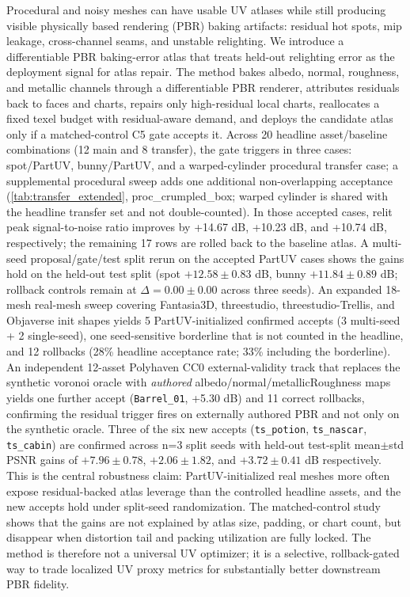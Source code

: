 Procedural and noisy meshes can have usable UV atlases while still producing visible physically based rendering (PBR) baking artifacts: residual hot spots, mip leakage, cross-channel seams, and unstable relighting. We introduce a differentiable PBR baking-error atlas that treats held-out relighting error as the deployment signal for atlas repair. The method bakes albedo, normal, roughness, and metallic channels through a differentiable PBR renderer, attributes residuals back to faces and charts, repairs only high-residual local charts, reallocates a fixed texel budget with residual-aware demand, and deploys the candidate atlas only if a matched-control C5 gate accepts it. Across 20 headline asset/baseline combinations (12 main and 8 transfer), the gate triggers in three cases: spot/PartUV, bunny/PartUV, and a warped-cylinder procedural transfer case; a supplemental procedural sweep adds one additional non-overlapping acceptance (\cref{tab:transfer_extended}, proc\_crumpled\_box; warped cylinder is shared with the headline transfer set and not double-counted). In those accepted cases, relit peak signal-to-noise ratio improves by +14.67 dB, +10.23 dB, and +10.74 dB, respectively; the remaining 17 rows are rolled back to the baseline atlas. A multi-seed proposal/gate/test split rerun on the accepted PartUV cases shows the gains hold on the held-out test split (spot $+12.58 \pm 0.83$ dB, bunny $+11.84 \pm 0.89$ dB; rollback controls remain at $\Delta = 0.00 \pm 0.00$ across three seeds). An expanded 18-mesh real-mesh sweep covering Fantasia3D, threestudio, threestudio-Trellis, and Objaverse init shapes yields 5 PartUV-initialized confirmed accepts (3 multi-seed + 2 single-seed), one seed-sensitive borderline that is not counted in the headline, and 12 rollbacks (28\% headline acceptance rate; 33\% including the borderline). An independent 12-asset Polyhaven CC0 external-validity track that replaces the synthetic voronoi oracle with \emph{authored} albedo/normal/metallicRoughness maps yields one further accept (\texttt{Barrel\_01}, +5.30 dB) and 11 correct rollbacks, confirming the residual trigger fires on externally authored PBR and not only on the synthetic oracle. Three of the six new accepts (\texttt{ts\_potion}, \texttt{ts\_nascar}, \texttt{ts\_cabin}) are confirmed across n=3 split seeds with held-out test-split mean$\pm$std PSNR gains of $+7.96 \pm 0.78$, $+2.06 \pm 1.82$, and $+3.72 \pm 0.41$ dB respectively. This is the central robustness claim: PartUV-initialized real meshes more often expose residual-backed atlas leverage than the controlled headline assets, and the new accepts hold under split-seed randomization. The matched-control study shows that the gains are not explained by atlas size, padding, or chart count, but disappear when distortion tail and packing utilization are fully locked. The method is therefore not a universal UV optimizer; it is a selective, rollback-gated way to trade localized UV proxy metrics for substantially better downstream PBR fidelity.
